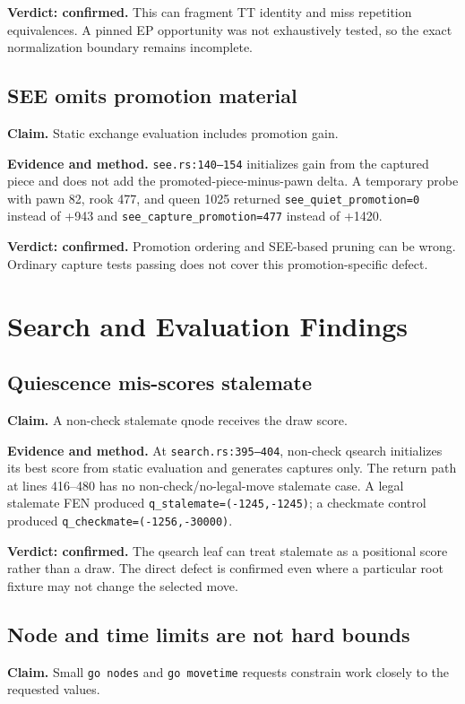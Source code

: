\documentclass[conference]{IEEEtran}
\newcommand{\code}[1]{\texttt{\small #1}}
\begin{document}
\textbf{Verdict: confirmed.} This can fragment TT identity and miss repetition equivalences. A pinned EP opportunity was not exhaustively tested, so the exact normalization boundary remains incomplete.

\subsection{SEE omits promotion material}
\textbf{Claim.} Static exchange evaluation includes promotion gain.

\textbf{Evidence and method.} \code{see.rs:140--154} initializes gain from the captured piece and does not add the promoted-piece-minus-pawn delta. A temporary probe with pawn 82, rook 477, and queen 1025 returned \code{see\_quiet\_promotion=0} instead of +943 and \code{see\_capture\_promotion=477} instead of +1420.

\textbf{Verdict: confirmed.} Promotion ordering and SEE-based pruning can be wrong. Ordinary capture tests passing does not cover this promotion-specific defect.

\section{Search and Evaluation Findings}
\subsection{Quiescence mis-scores stalemate}
\textbf{Claim.} A non-check stalemate qnode receives the draw score.

\textbf{Evidence and method.} At \code{search.rs:395--404}, non-check qsearch initializes its best score from static evaluation and generates captures only. The return path at lines 416--480 has no non-check/no-legal-move stalemate case. A legal stalemate FEN produced \code{q\_stalemate=(-1245,-1245)}; a checkmate control produced \code{q\_checkmate=(-1256,-30000)}.

\textbf{Verdict: confirmed.} The qsearch leaf can treat stalemate as a positional score rather than a draw. The direct defect is confirmed even where a particular root fixture may not change the selected move.

\subsection{Node and time limits are not hard bounds}
\textbf{Claim.} Small \code{go nodes} and \code{go movetime} requests constrain work closely to the requested values.
\end{document}
